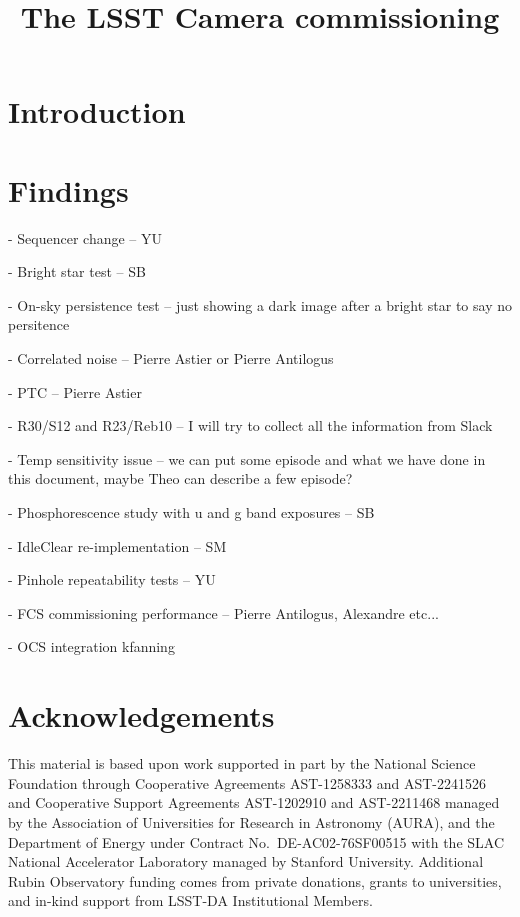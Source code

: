 \documentclass[OPS,lsstdraft,authoryear,toc]{lsstdoc}
\title{The LSST Camera commissioning}
\date{\vcsDate}
\begin{document}
\maketitle


\appendix

\section{Introduction}

\section{Findings}
- Sequencer change -- YU

- Bright star test -- SB

- On-sky persistence test -- just showing a dark image after a bright star to say no persitence

- Correlated noise -- Pierre Astier or Pierre Antilogus

- PTC -- Pierre Astier

- R30/S12 and R23/Reb10 -- I will try to collect all the information from Slack

- Temp sensitivity issue -- we can put some episode and what we have done in this document, maybe Theo can describe a few episode?

- Phosphorescence study with u and g band exposures -- SB

- IdleClear re-implementation -- SM

- Pinhole repeatability tests -- YU

- FCS commissioning performance -- Pierre Antilogus, Alexandre etc...

- OCS integration kfanning


\section{Acknowledgements}

This material is based upon work supported in part by the National Science Foundation through Cooperative Agreements AST-1258333 and AST-2241526 and Cooperative Support Agreements AST-1202910 and AST-2211468 managed by the Association of Universities for Research in Astronomy (AURA), and the Department of Energy under Contract No.\ DE-AC02-76SF00515 with the SLAC National Accelerator Laboratory managed by Stanford University.
Additional Rubin Observatory funding comes from private donations, grants to universities, and in-kind support from LSST-DA Institutional Members.
\end{document}
